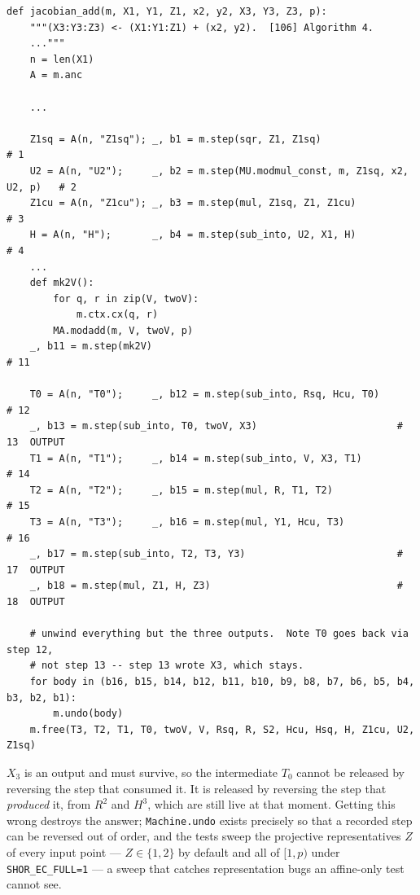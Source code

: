 \documentclass[11pt]{article}
\newcommand{\code}[1]{\texttt{#1}}
\theoremstyle{plain}
\theoremstyle{remark}
\begin{document}
\begin{lstlisting}
def jacobian_add(m, X1, Y1, Z1, x2, y2, X3, Y3, Z3, p):
    """(X3:Y3:Z3) <- (X1:Y1:Z1) + (x2, y2).  [106] Algorithm 4.
    ..."""
    n = len(X1)
    A = m.anc

    ...

    Z1sq = A(n, "Z1sq"); _, b1 = m.step(sqr, Z1, Z1sq)                    # 1
    U2 = A(n, "U2");     _, b2 = m.step(MU.modmul_const, m, Z1sq, x2, U2, p)   # 2
    Z1cu = A(n, "Z1cu"); _, b3 = m.step(mul, Z1sq, Z1, Z1cu)              # 3
    H = A(n, "H");       _, b4 = m.step(sub_into, U2, X1, H)              # 4
    ...
    def mk2V():
        for q, r in zip(V, twoV):
            m.ctx.cx(q, r)
        MA.modadd(m, V, twoV, p)
    _, b11 = m.step(mk2V)                                                 # 11

    T0 = A(n, "T0");     _, b12 = m.step(sub_into, Rsq, Hcu, T0)          # 12
    _, b13 = m.step(sub_into, T0, twoV, X3)                        # 13  OUTPUT
    T1 = A(n, "T1");     _, b14 = m.step(sub_into, V, X3, T1)             # 14
    T2 = A(n, "T2");     _, b15 = m.step(mul, R, T1, T2)                  # 15
    T3 = A(n, "T3");     _, b16 = m.step(mul, Y1, Hcu, T3)                # 16
    _, b17 = m.step(sub_into, T2, T3, Y3)                          # 17  OUTPUT
    _, b18 = m.step(mul, Z1, H, Z3)                                # 18  OUTPUT

    # unwind everything but the three outputs.  Note T0 goes back via step 12,
    # not step 13 -- step 13 wrote X3, which stays.
    for body in (b16, b15, b14, b12, b11, b10, b9, b8, b7, b6, b5, b4, b3, b2, b1):
        m.undo(body)
    m.free(T3, T2, T1, T0, twoV, V, Rsq, R, S2, Hcu, Hsq, H, Z1cu, U2, Z1sq)
\end{lstlisting}

\begin{warnbox}[title={The order of unwinding is not simply ``backwards''}]
$X_3$ is an output and must survive, so the intermediate $T_0$ cannot be released by reversing the
step that consumed it. It is released by reversing the step that \emph{produced} it, from $R^2$ and
$H^3$, which are still live at that moment. Getting this wrong destroys the answer;
\code{Machine.undo} exists precisely so that a recorded step can be reversed out of order, and the
tests sweep the projective representatives $Z$ of every input point --- $Z\in\{1,2\}$ by default
and all of $[1,p)$ under \code{SHOR\_EC\_FULL=1} --- a sweep that catches representation bugs an
affine-only test cannot see.
\end{warnbox}
\end{document}
